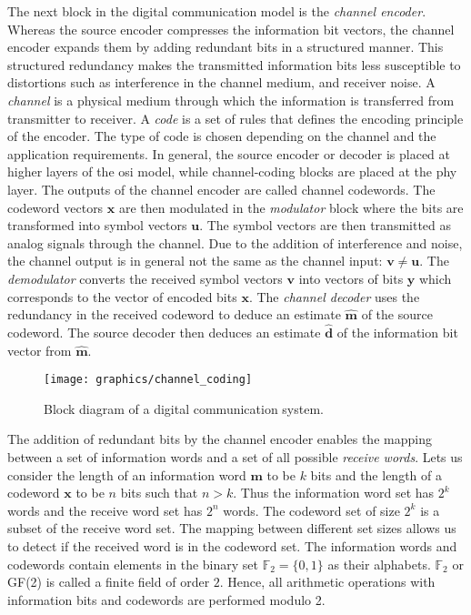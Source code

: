 The next block in the digital communication model is the \emph{channel encoder}. Whereas the source encoder compresses the information bit vectors, the channel encoder expands them by adding redundant bits in a structured manner. This structured redundancy makes the transmitted information bits less susceptible to distortions such as interference in the channel medium, and receiver noise. A \emph{channel} is a physical medium through which the information is transferred from transmitter to receiver. A \emph{code} is a set of rules that defines the encoding principle of the encoder. The type of code is chosen depending on the channel and the application requirements. In general, the source encoder or decoder is placed at higher layers of the \ac{osi} model, while channel-coding blocks are placed at the \ac{phy} layer. The outputs of the channel encoder are called channel codewords. The codeword vectors $\mathbf{x}$ are then modulated in the \emph{modulator} block where the bits are transformed into symbol vectors $\mathbf{u}$. The symbol vectors are then transmitted as analog signals through the channel. Due to the addition of interference and noise, the channel output is in general not the same as the channel input: $\mathbf{v}\neq\mathbf{u}$. The \emph{demodulator} converts the received symbol vectors $\mathbf{v}$ into vectors of bits $\mathbf{y}$ which corresponds to the vector of encoded bits $\mathbf{x}$. The \emph{channel decoder} uses the redundancy in the received codeword to deduce an estimate $\widehat{\mathbf{m}}$ of the source codeword. The source decoder then deduces an estimate $\widehat{\mathbf{d}}$ of the information bit vector from $\widehat{\mathbf{m}}$.

\begin{figure}[htbp]
  \centering
  \texttt{[image: graphics/channel\_coding]}
  \caption{Block diagram of a digital communication system.}
  \label{fig:chanCoding}
\end{figure}

The addition of redundant bits by the channel encoder enables the mapping between a set of information words and a set of all possible \emph{receive words}. Lets us consider the length of an information word $\mathbf{m}$ to be $k$ bits and the length of a codeword $\mathbf{x}$ to be $n$ bits such that $n>k$. Thus the information word set has $2^k$ words and the receive word set has $2^n$ words. The codeword set of size $2^k$ is a subset of the receive word set. The mapping between different set sizes allows us to detect if the received word is in the codeword set. The information words and codewords contain elements in the binary set $\mathbb{F}_2=\{0,1\}$ as their alphabets. $\mathbb{F}_2$ or GF(2) is called a finite field of order $2$. Hence, all arithmetic operations with information bits and codewords are performed modulo 2.

